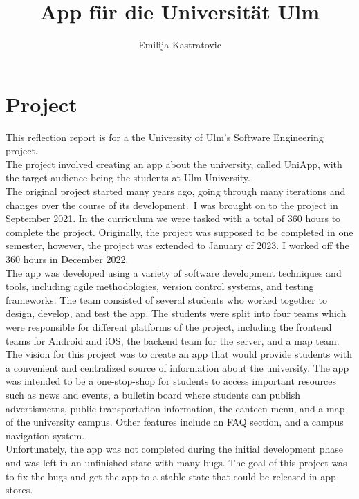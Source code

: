 \documentclass[sf-font,usefira,english]{uulm/sp/article}
\title{App für die Universität Ulm}
\author{Emilija Kastratovic}
\begin{document}
\maketitle
\section{Project}

This reflection report is for a the University of Ulm's Software Engineering project.\\
The project involved creating an app about the university, called UniApp, 
with the target audience being the students at Ulm University.\\

The original project started many years ago, 
going through many iterations and changes over the course of its development.\
I was brought on to the project in September 2021.
In the curriculum we were tasked with a total of 360 hours to complete the project. 
Originally, the project was supposed to be completed in one semester,
however, the project was extended to January of 2023.
I worked off the 360 hours in December 2022.\\

The app was developed using a variety of software development techniques and tools, 
including agile methodologies, version control systems, and testing frameworks. 
The team consisted of several students who worked together to design, develop, and test the app.
The students were split into four teams which were responsible for different platforms of the project, including the
frontend teams for Android and iOS, the backend team for the server, and a map team.\\

The vision for this project was to create an app that would provide students 
with a convenient and centralized source of information about the university. 
The app was intended to be a one-stop-shop for students to access 
important resources such as news and events, a bulletin board where students
can publish advertismetns, public transportation information, the canteen menu,
and a map of the university campus. Other features include an FAQ section, 
and a campus navigation system. \\

Unfortunately, the app was not completed during the initial development phase 
and was left in an unfinished state with many bugs.
The goal of this project was to fix the bugs and get the app to a stable state 
that could be released in app stores. \\
\end{document}
